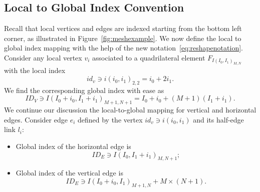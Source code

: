 \subsection{Local to Global Index Convention}
Recall that local vertices and edges are indexed starting from the bottom left corner, 
as illustrated in Figure~\ref{fig:meshexample}.
We now define the local to global index mapping with the help of the new notation~\eqref{eq:reshapenotation}.
Consider any local vertex $v_i$ associated to a quadrilateral element $F_{I(I_0,I_1)_{M,N}}$ with the local index
\begin{equation}
id_v \ni i(i_0, i_1)_{2,2} = i_0 + 2i_1.
\end{equation}
We find the corresponding global index with ease as
\begin{equation}
		  ID_V \ni I(I_0+i_0, I_1+i_1)_{M+1,N+1} = I_0 + i_0 + (M+1)(I_1+i_1).
\end{equation}
We continue our discussion the local-to-global mapping for vertical and horizontal edges.
Consider edge $e_i$ defined by the vertex $id_v \ni i(i_0,i_1)$ and its half-edge link $l_i$:
\begin{itemize}
		  \item Global index of the horizontal edge is
\begin{equation}
		  ID_E \ni I(I_0,I_1+i_1)_{M,N+1};
\end{equation}
		  \item Global index of the vertical edge is
\begin{equation}
		  ID_E \ni I(I_0+i_0,I_1)_{M+1,N} + M\times (N+1).
\end{equation}
\end{itemize}

